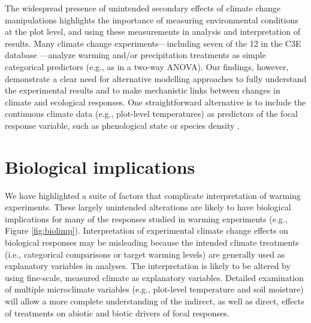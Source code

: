 \documentclass{article}
\begin{document}
\par The widespread presence of unintended secondary effects of climate change manipulations highlights the importance of measuring environmental conditions at the plot level, and using these measurements in analysis and interpretation of results. Many climate change experiments---including seven of the 12 in the C3E database %
---analyze warming and/or precipitation treatments as simple categorical predictors (e.g., as in a two-way ANOVA). Our findings, however, demonstrate a clear need for alternative modelling approaches to fully understand the experimental results and to make mechanistic links between changes in climate and ecological responses. One straightforward alternative is to include the continuous climate data (e.g., plot-level temperatures) as predictors of the focal response variable, such as phenological state or species density \citep [e.g.,][]{marchin2015, pelini2014}. 

\section* {Biological implications}

\par We have highlighted a suite of factors that complicate interpretation of warming experiments. These largely unintended alterations are likely to have biological implications for many of the responses studied in warming experiments (e.g., Figure \ref{fig:biolimp}). Interpretation of experimental climate change effects on biological responses may be misleading because the intended climate treatments (i.e., categorical comparisons or target warming levels) are generally used as explanatory variables in analyses. The interpretation is likely to be altered by using fine-scale, measured climate as explanatory variables. Detailed examination of multiple microclimate variables (e.g., plot-level temperature and soil moisture) will allow a more complete understanding of the indirect, as well as direct, effects of treatments on abiotic and biotic drivers of focal responses.
\end{document}
